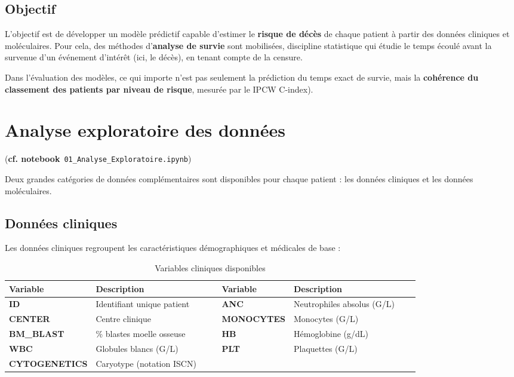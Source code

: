 \documentclass[12pt,a4paper]{article}
\begin{document}
\newpage
\subsection{Objectif}

L’objectif est de développer un modèle prédictif capable d’estimer le \textbf{risque de décès} de chaque patient à partir des données cliniques et moléculaires. Pour cela, des méthodes d’\textbf{analyse de survie} sont mobilisées, discipline statistique qui étudie le temps écoulé avant la survenue d’un événement d’intérêt (ici, le décès), en tenant compte de la censure.

Dans l’évaluation des modèles, ce qui importe n’est pas seulement la prédiction du temps exact de survie, mais la \textbf{cohérence du classement des patients par niveau de risque}, mesurée par le IPCW C-index).

\newpage

\section{Analyse exploratoire des données}
\noindent(\textbf{cf. notebook}~\texttt{01\_Analyse\_Exploratoire.ipynb})

Deux grandes catégories de données complémentaires sont disponibles pour chaque patient : les données cliniques et les données moléculaires.

\subsection{Données cliniques}
Les données cliniques regroupent les caractéristiques démographiques et médicales de base :
\begin{table}[H]
\centering
\footnotesize
\begin{tabular}{>{\bfseries}l p{0.4\linewidth} >{\bfseries}l p{0.4\linewidth}}
\toprule
\textbf{Variable} & \textbf{Description} & \textbf{Variable} & \textbf{Description} \\
\midrule
ID & Identifiant unique patient & ANC & Neutrophiles absolus (G/L) \\
CENTER & Centre clinique & MONOCYTES & Monocytes (G/L) \\
BM\_BLAST & \% blastes moelle osseuse & HB & Hémoglobine (g/dL) \\
WBC & Globules blancs (G/L) & PLT & Plaquettes (G/L) \\
CYTOGENETICS & Caryotype (notation ISCN) & & \\
\bottomrule
\end{tabular}
\caption{Variables cliniques disponibles}
\label{tab:variables_cliniques_compact}
\end{table}
\end{document}
